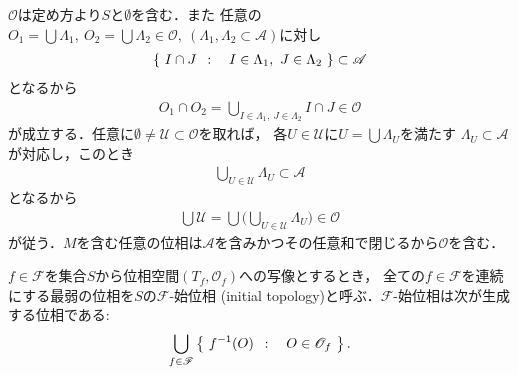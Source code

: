 	\begin{prf}
		$\mathscr{O}$は定め方より$S$と$\emptyset$を含む．また
		任意の$O_1 = \bigcup \Lambda_1,\ O_2=\bigcup \Lambda_2 \in \mathscr{O},\ 
		(\Lambda_1,\Lambda_2 \subset \mathscr{A})$に対し
		\begin{align}
			\left\{\ I \cap J\ \, : \quad I \in \Lambda_1,\ J \in \Lambda_2\ \right\} \subset \mathscr{A}
		\end{align}
		となるから
		\begin{align}
			O_1 \cap O_2 = \bigcup_{I \in \Lambda_1,\ J \in \Lambda_2} I \cap J \in \mathscr{O}
		\end{align}
		が成立する．任意に$\emptyset \neq \mathscr{U} \subset \mathscr{O}$を取れば，
		各$U \in \mathscr{U}$に$U = \bigcup \Lambda_U$を満たす
		$\Lambda_U \subset \mathscr{A}$が対応し，このとき
		\begin{align}
			\bigcup_{U \in \mathscr{U}} \Lambda_U \subset \mathscr{A}
		\end{align}
		となるから
		\begin{align}
			\bigcup \mathscr{U} = \bigcup \Biggl(\bigcup_{U \in \mathscr{U}} \Lambda_U\Biggr)
			\in \mathscr{O}
		\end{align}
		が従う．$M$を含む任意の位相は$\mathscr{A}$を含みかつその任意和で閉じるから$\mathscr{O}$を含む．
		\QED
	\end{prf}
	
	\begin{screen}
		\begin{dfn}[始位相]
			$f \in \mathscr{F}$を集合$S$から位相空間$(T_f,\mathscr{O}_f)$への写像とするとき，
			全ての$f \in \mathscr{F}$を連続にする最弱の位相を$S$の$\mathscr{F}$-始位相
			(initial topology)と呼ぶ．$\mathscr{F}$-始位相は次が生成する位相である:
			\begin{align}
				\bigcup_{f \in \mathscr{F}} \left\{\ f^{-1}(O)\ \, : \quad O \in \mathscr{O}_f\ \right\}.
			\end{align}
		\end{dfn}
	\end{screen}
	
